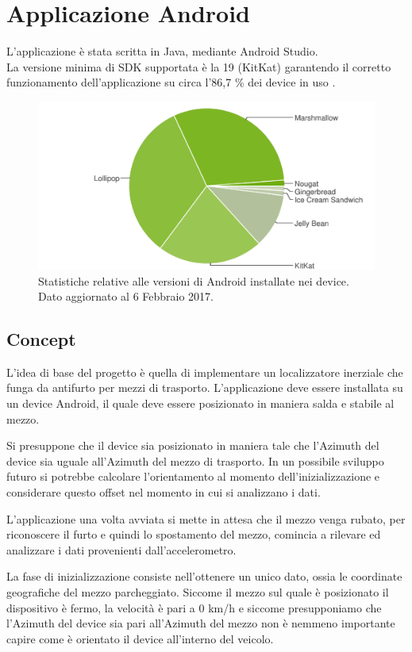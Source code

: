 \documentclass[12pt,a4paper,openright,twoside]{report}
\begin{document}
\section{Applicazione Android}
L'applicazione è stata scritta in Java, mediante Android Studio. \\
La versione minima di SDK supportata è la 19 (KitKat) garantendo il corretto funzionamento dell'applicazione su circa l'86,7 \% dei device in uso \cite{K17}.

\begin{figure}[h!]
\centering 
\includegraphics[scale=0.6]{fig11} 
\caption{Statistiche relative alle versioni di Android installate nei device. Dato aggiornato al 6 Febbraio 2017.} 
\end{figure}

\subsection{Concept}
L'idea di base del progetto è quella di implementare un localizzatore inerziale che funga da antifurto per mezzi di trasporto. L'applicazione deve essere installata su un device Android, il quale deve essere posizionato in maniera salda e stabile al mezzo.

Si presuppone che il device sia posizionato in maniera tale che l'Azimuth del device sia uguale all'Azimuth del mezzo di trasporto. In un possibile sviluppo futuro si potrebbe calcolare l'orientamento al momento dell'inizializzazione e considerare questo offset nel momento in cui si analizzano i dati.


L'applicazione una volta avviata si mette in attesa che il mezzo venga rubato, per riconoscere il furto e quindi lo spostamento del mezzo, comincia a rilevare ed analizzare i dati provenienti dall'accelerometro.

La fase di inizializzazione consiste nell'ottenere un unico dato, ossia le coordinate geografiche del mezzo parcheggiato. Siccome il mezzo sul quale è posizionato il dispositivo è fermo, la velocità è pari a 0 km/h e siccome presupponiamo che l'Azimuth del device sia pari all'Azimuth del mezzo non è nemmeno importante capire come è orientato il device all'interno del veicolo.
\end{document}
